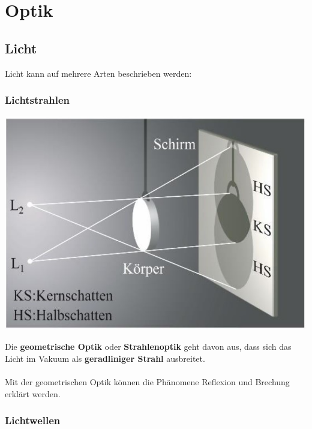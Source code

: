 \section{Optik}

\subsection{Licht}

Licht kann auf mehrere Arten beschrieben werden:


\subsubsection{Lichtstrahlen}

\begin{minipage}{0.48\linewidth}
\includegraphics[width=\linewidth]{Bilder/Wellen-Optik/lichtstrahlen}
\end{minipage}
\hfill
\begin{minipage}{0.48\linewidth}
Die \textbf{geometrische Optik} oder \textbf{Strahlenoptik} geht davon aus, dass sich das Licht im Vakuum als \textbf{geradliniger Strahl} ausbreitet.\\
\\
Mit der geometrischen Optik können die Phänomene Reflexion und Brechung erklärt werden.
\end{minipage}



\subsubsection{Lichtwellen}


